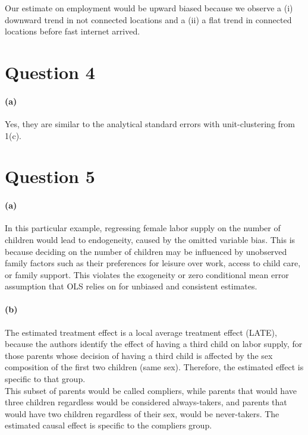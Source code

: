 \documentclass{scrartcl}
\begin{document}
Our estimate on employment would be upward biased because we observe a (i) downward trend in not connected locations and a (ii) a flat trend in connected locations before fast internet arrived.

\section*{Question 4}

\paragraph*{(a)} Yes, they are similar to the analytical standard errors with unit-clustering from 1(c).



\section*{Question 5}

\paragraph*{(a)}


In this particular example, regressing female labor supply on the number of children would lead to endogeneity, caused by the omitted variable bias. This is because deciding on the number of children may be influenced by unobserved family factors such as their preferences for leisure over work, access to child care, or family support. This violates the exogeneity or zero conditional mean error assumption that OLS relies on for unbiased and consistent estimates.

\paragraph*{(b)}


The estimated treatment effect is a local average treatment effect (LATE), because the authors identify the effect of having a third child on labor supply, for those parents whose decision of having a third child is affected by the sex composition of the first two children (same sex). Therefore, the estimated effect is specific to that group. \\
This subset of parents would be called compliers, while parents that would have three children regardless would be considered always-takers, and parents that would have two children regardless of their sex, would be never-takers. The estimated causal effect is specific to the compliers group.
\end{document}
